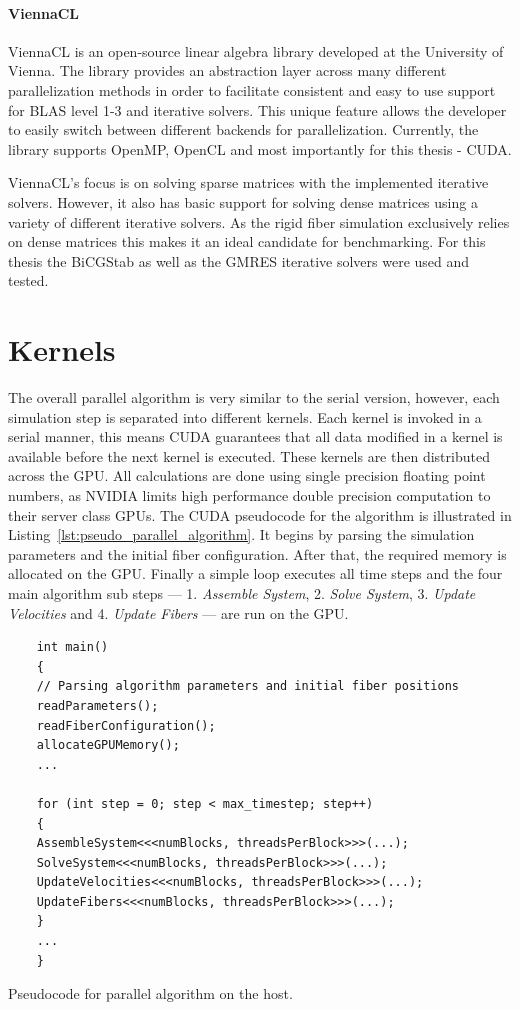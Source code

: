 \paragraph{ViennaCL}
ViennaCL is an open-source linear algebra library developed at the University of Vienna. The library provides an abstraction layer across many different parallelization methods in order to facilitate consistent and easy to use support for BLAS level 1-3 and iterative solvers. This unique feature allows the developer to easily switch between different backends for parallelization. Currently, the library supports OpenMP, OpenCL and most importantly for this thesis - CUDA.

ViennaCL's focus is on solving sparse matrices with the implemented iterative solvers. However, it also has basic support for solving dense matrices using a variety of different iterative solvers. As the rigid fiber simulation exclusively relies on dense matrices this makes it an ideal candidate for benchmarking. For this thesis the BiCGStab as well as the GMRES iterative solvers were used and tested.

\section{Kernels}
\label{sec:kernels}

The overall parallel algorithm is very similar to the serial version, however, each simulation step is separated into different kernels. Each kernel is invoked in a serial manner, this means CUDA guarantees that all data modified in a kernel is available before the next kernel is executed. These kernels are then distributed across the GPU. All calculations are done using single precision floating point numbers, as NVIDIA limits high performance double precision computation to their server class GPUs. The CUDA pseudocode for the algorithm is illustrated in Listing~\ref{lst:pseudo_parallel_algorithm}. It begins by parsing the simulation parameters and the initial fiber configuration. After that, the required memory is allocated on the GPU. Finally a simple loop executes all time steps and the four main algorithm sub steps — 1. \emph{Assemble System}, 2. \emph{Solve System}, 3. \emph{Update Velocities} and 4. \emph{Update Fibers} — are run on the GPU.

\begin{listing}[!htbp]
  \centering
  \begin{verbatim}
    int main()
    {
    // Parsing algorithm parameters and initial fiber positions
    readParameters();
    readFiberConfiguration();
    allocateGPUMemory();
    ...

    for (int step = 0; step < max_timestep; step++)
    {
    AssembleSystem<<<numBlocks, threadsPerBlock>>>(...);
    SolveSystem<<<numBlocks, threadsPerBlock>>>(...);
    UpdateVelocities<<<numBlocks, threadsPerBlock>>>(...);
    UpdateFibers<<<numBlocks, threadsPerBlock>>>(...);
    }
    ...
    }
  \end{verbatim}
  \caption{Pseudocode for parallel algorithm on the host.}
  \label{lst:pseudo_parallel_algorithm}
\end{listing}

